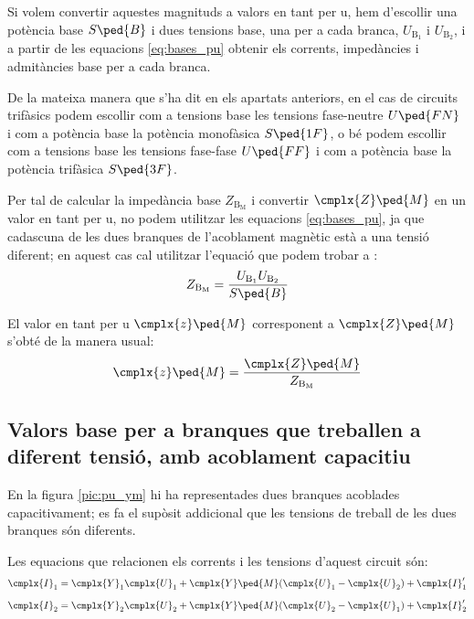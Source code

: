 Si volem convertir aquestes magnituds a valors en tant per u, hem d'escollir  una potència base $S\ped{B}$ i dues tensions base, una  per a cada branca, $U_{\text{B}_1}$ i  $U_{\text{B}_2}$, i a partir de les equacions \eqref{eq:bases_pu} obtenir els corrents, impedàncies i admitàncies base per a cada branca.

De la mateixa manera que s'ha dit en els apartats anteriors, en el cas de circuits trifàsics podem escollir com a tensions base les tensions fase-neutre $U\ped{FN}$ i com a potència base la potència  monofàsica $S\ped{1F}$, o bé podem escollir com a tensions base les tensions fase-fase $U\ped{FF}$ i com a potència base la potència trifàsica $S\ped{3F}$.


Per tal de calcular la impedància base $Z_{\text{B}_\text{M}}$ i convertir $\cmplx{Z}\ped{M}$ en un valor en tant per u, no podem utilitzar les equacions \eqref{eq:bases_pu}, ja que cadascuna de les dues branques de l'acoblament magnètic està a una tensió diferent; en aquest cas cal utilitzar l'equació que podem trobar a \cite{TLE}:
\begin{equation}
    Z_{\text{B}_\text{M}} = \frac{U_{\text{B}_1} U_{\text{B}_2}} {S\ped{B}}
\end{equation}

El valor en tant per u $\cmplx{z}\ped{M}$ corresponent a $\cmplx{Z}\ped{M}$ s'obté de la manera usual:
\begin{equation}
    \cmplx{z}\ped{M} = \frac{\cmplx{Z}\ped{M}}{Z_{\text{B}_\text{M}}}
\end{equation}


\subsection{Valors base per a branques que treballen a diferent tensió, amb acoblament capacitiu}

En la figura \vref{pic:pu_ym} hi ha representades dues branques acoblades capacitivament; es fa el supòsit addicional que les tensions de treball de les dues branques són diferents.

\begin{center}
    
    \label{pic:pu_ym}
\end{center}

Les equacions que relacionen els corrents i les tensions d'aquest circuit són:
\begin{subequations}
\begin{align}
    \cmplx{I}_1  &= \cmplx{Y}_1 \cmplx{U}_1 +  \cmplx{Y}\ped{M}(\cmplx{U}_1-\cmplx{U}_2)  + \cmplx{I}'_1   \\[2mm]
    \cmplx{I}_2  &= \cmplx{Y}_2 \cmplx{U}_2 +  \cmplx{Y}\ped{M}(\cmplx{U}_2-\cmplx{U}_1)  + \cmplx{I}'_2
\end{align}
\end{subequations}

